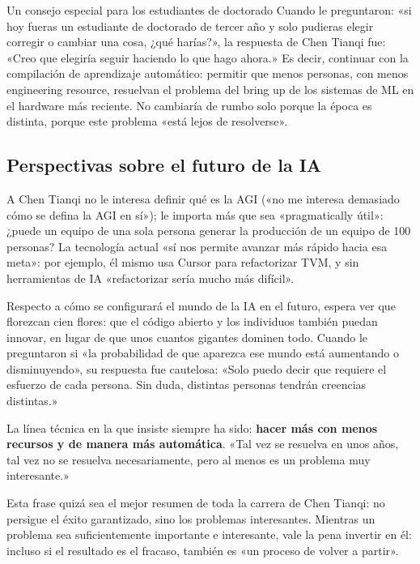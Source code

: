 \begin{knowledgebox}{Un consejo especial para los estudiantes de doctorado}
Cuando le preguntaron: «si hoy fueras un estudiante de doctorado de tercer año y solo pudieras elegir corregir o cambiar una cosa, ¿qué harías?», la respuesta de Chen Tianqi fue: «Creo que elegiría seguir haciendo lo que hago ahora.» Es decir, continuar con la compilación de aprendizaje automático: permitir que menos personas, con menos engineering resource, resuelvan el problema del bring up de los sistemas de ML en el hardware más reciente. No cambiaría de rumbo solo porque la época es distinta, porque este problema «está lejos de resolverse».
\end{knowledgebox}

\subsection{Perspectivas sobre el futuro de la IA}

A Chen Tianqi no le interesa definir qué es la AGI («no me interesa demasiado cómo se defina la AGI en sí»); le importa más que sea «pragmatically útil»: ¿puede un equipo de una sola persona generar la producción de un equipo de 100 personas? La tecnología actual «sí nos permite avanzar más rápido hacia esa meta»: por ejemplo, él mismo usa Cursor para refactorizar TVM, y sin herramientas de IA «refactorizar sería mucho más difícil».

Respecto a cómo se configurará el mundo de la IA en el futuro, espera ver que florezcan cien flores: que el código abierto y los individuos también puedan innovar, en lugar de que unos cuantos gigantes dominen todo. Cuando le preguntaron si «la probabilidad de que aparezca ese mundo está aumentando o disminuyendo», su respuesta fue cautelosa: «Solo puedo decir que requiere el esfuerzo de cada persona. Sin duda, distintas personas tendrán creencias distintas.»

La línea técnica en la que insiste siempre ha sido: \textbf{hacer más con menos recursos y de manera más automática}. «Tal vez se resuelva en unos años, tal vez no se resuelva necesariamente, pero al menos es un problema muy interesante.»

Esta frase quizá sea el mejor resumen de toda la carrera de Chen Tianqi: no persigue el éxito garantizado, sino los problemas interesantes. Mientras un problema sea suficientemente importante e interesante, vale la pena invertir en él: incluso si el resultado es el fracaso, también es «un proceso de volver a partir».

